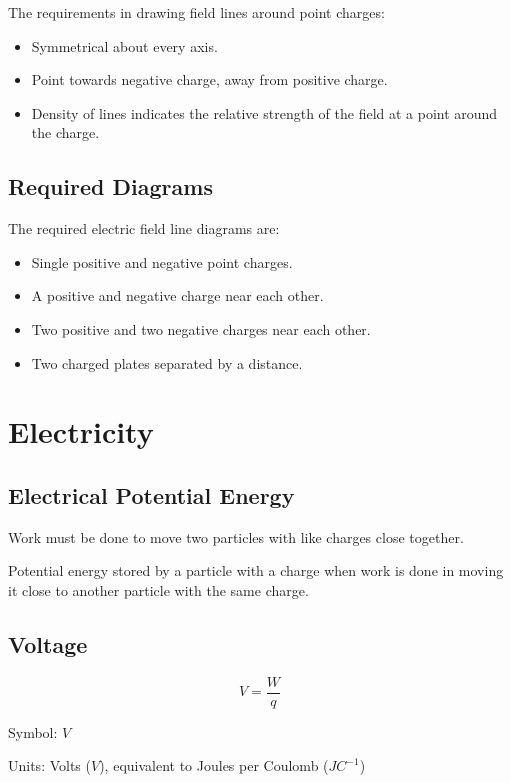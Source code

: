 \documentclass[a4paper,11pt]{article}
\begin{document}
The requirements in drawing field lines around point charges:

\begin{itemize}
\item Symmetrical about every axis.
\item Point towards negative charge, away from positive charge.
\item Density of lines indicates the relative strength of the field at a point
	around the charge.
\end{itemize}


\subsection{Required Diagrams}

The required electric field line diagrams are:

\begin{itemize}
\item Single positive and negative point charges.
\item A positive and negative charge near each other.
\item Two positive and two negative charges near each other.
\item Two charged plates separated by a distance.
\end{itemize}




\section{Electricity}

\subsection{Electrical Potential Energy}

Work must be done to move two particles with like charges close together.

Potential energy stored by a particle with a charge when work is done in moving
it close to another particle with the same charge.


\subsection{Voltage}

$$
V = \frac{W}{q}
$$

Symbol: $V$

Units: Volts ($V$), equivalent to Joules per Coulomb ($JC^{-1}$)
\end{document}
